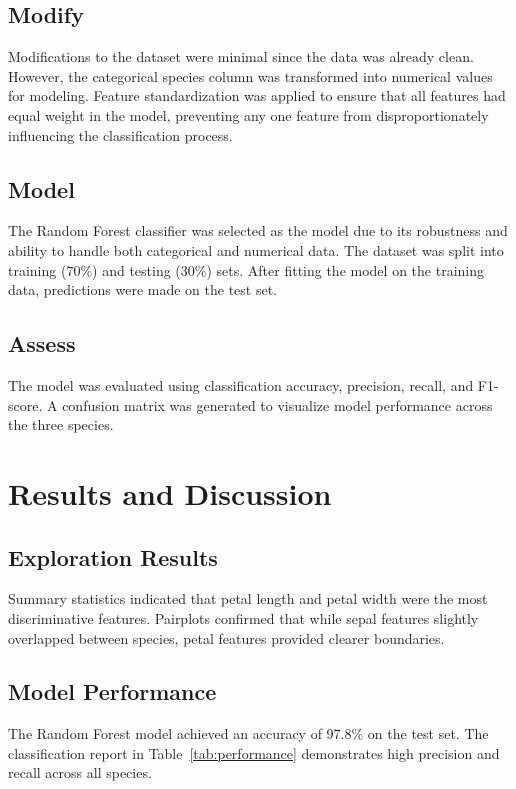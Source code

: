 \documentclass{article}
\begin{document}
\subsection{Modify}
Modifications to the dataset were minimal since the data was already clean. However, the categorical species column was transformed into numerical values for modeling. Feature standardization was applied to ensure that all features had equal weight in the model, preventing any one feature from disproportionately influencing the classification process.

\subsection{Model}
The Random Forest classifier was selected as the model due to its robustness and ability to handle both categorical and numerical data. The dataset was split into training (70\%) and testing (30\%) sets. After fitting the model on the training data, predictions were made on the test set.

\subsection{Assess}
The model was evaluated using classification accuracy, precision, recall, and F1-score. A confusion matrix was generated to visualize model performance across the three species.

\section{Results and Discussion}

\subsection{Exploration Results}
Summary statistics indicated that petal length and petal width were the most discriminative features. Pairplots confirmed that while sepal features slightly overlapped between species, petal features provided clearer boundaries.

\subsection{Model Performance}
The Random Forest model achieved an accuracy of 97.8\% on the test set. The classification report in Table~\ref{tab:performance} demonstrates high precision and recall across all species.
\end{document}
